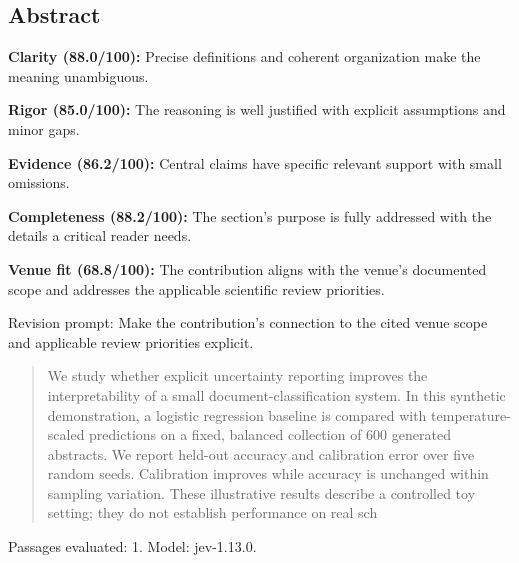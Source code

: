 \documentclass[11pt]{article}
\begin{document}
\subsection{Abstract}
\par\textbf{Clarity (88.0/100):} Precise definitions and coherent organization make the meaning unambiguous.
\par\textbf{Rigor (85.0/100):} The reasoning is well justified with explicit assumptions and minor gaps.
\par\textbf{Evidence (86.2/100):} Central claims have specific relevant support with small omissions.
\par\textbf{Completeness (88.2/100):} The section's purpose is fully addressed with the details a critical reader needs.
\par\textbf{Venue fit (68.8/100):} The contribution aligns with the venue's documented scope and addresses the applicable scientific review priorities.
\par Revision prompt: Make the contribution's connection to the cited venue scope and applicable review priorities explicit.
\begin{quote}\small We study whether explicit uncertainty reporting improves the interpretability of a small
document-classification system. In this synthetic demonstration, a logistic regression baseline is
compared with temperature-scaled predictions on a fixed, balanced collection of 600 generated
abstracts. We report held-out accuracy and calibration error over five random seeds. Calibration
improves while accuracy is unchanged within sampling variation. These illustrative results describe a
controlled toy setting; they do not establish performance on real sch\end{quote}
Passages evaluated: 1. Model: jev-1.13.0.
\end{document}
